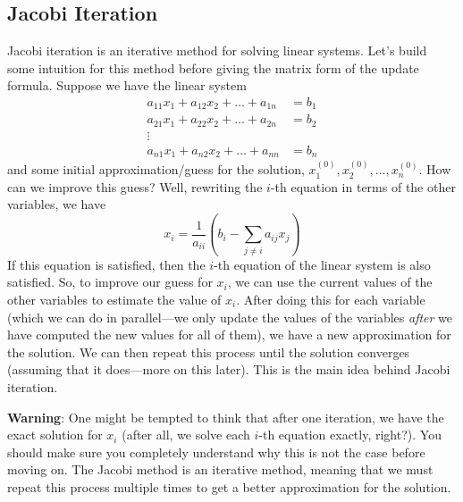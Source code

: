 \subsection{Jacobi Iteration}
Jacobi iteration is an iterative method for solving linear systems. Let's build some intuition for this method before giving the matrix form of the update formula. Suppose we have the linear system
\begin{align*}
    a_{11}x_1 + a_{12}x_2 + \dots + a_{1n} & = b_1 \\
    a_{21}x_1 + a_{22}x_2 + \dots + a_{2n} & = b_2 \\
    \vdots & \\
    a_{n1}x_1 + a_{n2}x_2 + \dots + a_{nn} & = b_n
\end{align*}
and some initial approximation/guess for the solution, $ x_1^{(0)}, x_2^{(0)}, \dots, x_n^{(0)} $. How can we improve this guess? Well, rewriting the $i$-th equation in terms of the other variables, we have
\begin{equation*}
    x_i = \frac{1}{a_{ii}} \left( b_i - \sum_{j \neq i} a_{ij}x_j \right)
\end{equation*}
If this equation is satisfied, then the $i$-th equation of the linear system is also satisfied. So, to improve our guess for $x_i$, we can use the current values of the other variables to estimate the value of $x_i$. After doing this for each variable (which we can do in parallel---we only update the values of the variables \textit{after} we have computed the new values for all of them), we have a new approximation for the solution. We can then repeat this process until the solution converges (assuming that it does---more on this later). This is the main idea behind Jacobi iteration.
\begin{warningBox}
    \textbf{Warning}: One might be tempted to think that after one iteration, we have the exact solution for $x_i$ (after all, we solve each $i$-th equation exactly, right?). You should make sure you completely understand why this is not the case before moving on. The Jacobi method is an iterative method, meaning that we must repeat this process multiple times to get a better approximation for the solution.
\end{warningBox}

